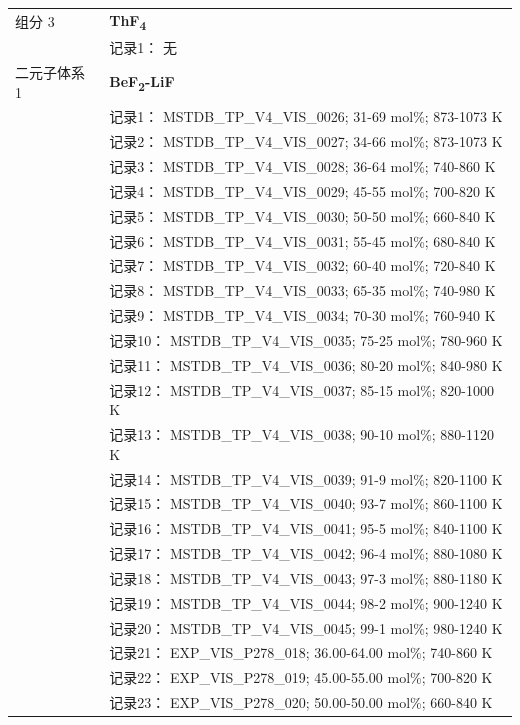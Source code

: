 \documentclass[12pt]{article}
\begin{document}
{\begin{longtable}[]{@{}
  >{\raggedright\arraybackslash}p{}
  >{\raggedright\arraybackslash}p{}@{}}
组分 3 & \textbf{ThF\textsubscript{4}} \\
 & 记录1： 无 \\
二元子体系 1  & \textbf{BeF\textsubscript{2}-LiF} \\
 & 记录1： MSTDB\_TP\_V4\_VIS\_0026; 31-69 mol\%; 873-1073 K \\
 & 记录2： MSTDB\_TP\_V4\_VIS\_0027; 34-66 mol\%; 873-1073 K \\
 & 记录3： MSTDB\_TP\_V4\_VIS\_0028; 36-64 mol\%; 740-860 K \\
 & 记录4： MSTDB\_TP\_V4\_VIS\_0029; 45-55 mol\%; 700-820 K \\
 & 记录5： MSTDB\_TP\_V4\_VIS\_0030; 50-50 mol\%; 660-840 K \\
 & 记录6： MSTDB\_TP\_V4\_VIS\_0031; 55-45 mol\%; 680-840 K \\
 & 记录7： MSTDB\_TP\_V4\_VIS\_0032; 60-40 mol\%; 720-840 K \\
 & 记录8： MSTDB\_TP\_V4\_VIS\_0033; 65-35 mol\%; 740-980 K \\
 & 记录9： MSTDB\_TP\_V4\_VIS\_0034; 70-30 mol\%; 760-940 K \\
 & 记录10： MSTDB\_TP\_V4\_VIS\_0035; 75-25 mol\%; 780-960 K \\
 & 记录11： MSTDB\_TP\_V4\_VIS\_0036; 80-20 mol\%; 840-980 K \\
 & 记录12： MSTDB\_TP\_V4\_VIS\_0037; 85-15 mol\%; 820-1000 K \\
 & 记录13： MSTDB\_TP\_V4\_VIS\_0038; 90-10 mol\%; 880-1120 K \\
 & 记录14： MSTDB\_TP\_V4\_VIS\_0039; 91-9 mol\%; 820-1100 K \\
 & 记录15： MSTDB\_TP\_V4\_VIS\_0040; 93-7 mol\%; 860-1100 K \\
 & 记录16： MSTDB\_TP\_V4\_VIS\_0041; 95-5 mol\%; 840-1100 K \\
 & 记录17： MSTDB\_TP\_V4\_VIS\_0042; 96-4 mol\%; 880-1080 K \\
 & 记录18： MSTDB\_TP\_V4\_VIS\_0043; 97-3 mol\%; 880-1180 K \\
 & 记录19： MSTDB\_TP\_V4\_VIS\_0044; 98-2 mol\%; 900-1240 K \\
 & 记录20： MSTDB\_TP\_V4\_VIS\_0045; 99-1 mol\%; 980-1240 K \\
 & 记录21： EXP\_VIS\_P278\_018; 36.00-64.00 mol\%; 740-860 K \\
 & 记录22： EXP\_VIS\_P278\_019; 45.00-55.00 mol\%; 700-820 K \\
 & 记录23： EXP\_VIS\_P278\_020; 50.00-50.00 mol\%; 660-840 K \\

\end{longtable}}
\end{document}
